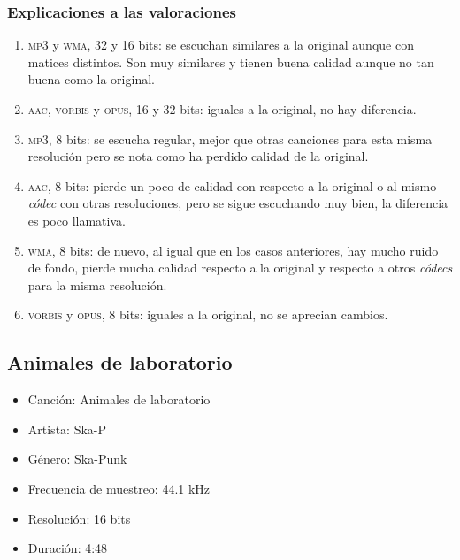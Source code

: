 \documentclass[11pt,a4paper]{article}
\begin{document}
\subsubsection{Explicaciones a las valoraciones}
\begin{enumerate}
	\item \textsc{mp3} y \textsc{wma}, 32 y 16 bits: se escuchan similares a la original aunque con matices distintos. Son muy similares y tienen buena calidad aunque no tan buena como la original.
	\item \textsc{aac, vorbis} y \textsc{opus}, 16 y 32 bits: iguales a la original, no hay diferencia.
	\item \textsc{mp3}, 8 bits: se escucha regular, mejor que otras canciones para esta misma resolución pero se nota como ha perdido calidad de la original.
	\item \textsc{aac}, 8 bits: pierde un poco de calidad con respecto a la original o al mismo \textit{códec} con otras resoluciones, pero se sigue escuchando muy bien, la diferencia es poco llamativa.
	\item \textsc{wma}, 8 bits: de nuevo, al igual que en los casos anteriores, hay mucho ruido de fondo, pierde mucha calidad respecto a la original y respecto a otros \textit{códecs} para la misma resolución.
	\item \textsc{vorbis} y \textsc{opus}, 8 bits: iguales a la original, no se aprecian cambios.
\end{enumerate}

\subsection{Animales de laboratorio}

\begin{itemize}
	\item Canción: Animales de laboratorio
	\item Artista: Ska-P
	\item Género: Ska-Punk
	\item Frecuencia de muestreo: 44.1 kHz
	\item Resolución: 16 bits
	\item Duración: 4:48
\end{itemize}
\end{document}
